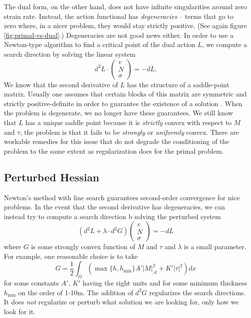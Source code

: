 \documentclass{article}
\theoremstyle{definition}
\theoremstyle{plain}
\begin{document}
The dual form, on the other hand, does not have infinite singularities around zero strain rate.
Instead, the action functional has \emph{degeneracies} -- terms that go to zero where, in a nicer problem, they would stay strictly positive.
(See again figure \ref{fig:primal-vs-dual}.)
Degeneracies are not good news either.
In order to use a Newton-type algorithm to find a critical point of the dual action $L$, we compute a search direction by solving the linear system
\begin{equation}
    d^2L\cdot\left(\begin{matrix} v \\ N \\ \sigma\end{matrix}\right) = -dL.
\end{equation}
We know that the second derivative of $L$ has the structure of a saddle-point matrix.
Usually one assumes that certain blocks of this matrix are symmetric and strictly positive-definite in order to guarantee the existence of a solution \citep{boffi2013mixed}.
When the problem is degenerate, we no longer have these guarantees.
We still know that $L$ has a unique saddle point because it is \emph{strictly} convex with respect to $M$ and $\tau$, the problem is that it fails to be \emph{strongly} or \emph{uniformly} convex.
There are workable remedies for this issue that do not degrade the conditioning of the problem to the same extent as regularization does for the primal problem.

\subsection{Perturbed Hessian}

Newton's method with line search guarantees second-order convergence for nice problems.
In the event that the second derivative has degeneracies, we can instead try to compute a search direction b solving the perturbed system
\begin{equation}
    \left(d^2L + \lambda\cdot d^2G\right)\left(\begin{matrix} v \\ N \\ \sigma\end{matrix}\right) = -dL
    \label{eq:regularized-newton-step}
\end{equation}
where $G$ is some strongly convex function of $M$ and $\tau$ and $\lambda$ is a small parameter.
For example, one reasonable choice is to take
\begin{equation}
    G = \frac{1}{2}\int_\Omega\left(\max\{h, h_{\text{min}}\}A'|M|_{\mathscr{A}}^2 + K'|\tau|^2\right)dx
\end{equation}
for some constants $A'$, $K'$ having the right units and for some minimum thickness $h_{\text{min}}$ on the order of 1-10m.
The addition of $d^2G$ regularizes the search directions.
It does \emph{not} regularize or perturb what solution we are looking for, only how we look for it.
\end{document}
